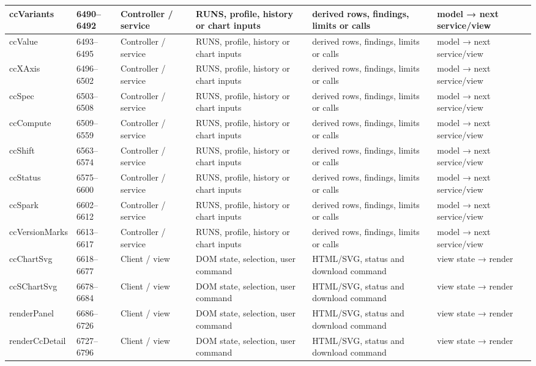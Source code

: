 \begin{landscape}
\begin{longtable}{@{}p{3.2cm}p{1.45cm}p{2.7cm}p{4.0cm}p{4.0cm}p{3.0cm}@{}}
ccVariants & 6490--6492 & Controller / service & RUNS, profile, history or chart inputs & derived rows, findings, limits or calls & model → next service/view \\\hline
ccValue & 6493--6495 & Controller / service & RUNS, profile, history or chart inputs & derived rows, findings, limits or calls & model → next service/view \\\hline
ccXAxis & 6496--6502 & Controller / service & RUNS, profile, history or chart inputs & derived rows, findings, limits or calls & model → next service/view \\\hline
ccSpec & 6503--6508 & Controller / service & RUNS, profile, history or chart inputs & derived rows, findings, limits or calls & model → next service/view \\\hline
ccCompute & 6509--6559 & Controller / service & RUNS, profile, history or chart inputs & derived rows, findings, limits or calls & model → next service/view \\\hline
ccShift & 6563--6574 & Controller / service & RUNS, profile, history or chart inputs & derived rows, findings, limits or calls & model → next service/view \\\hline
ccStatus & 6575--6600 & Controller / service & RUNS, profile, history or chart inputs & derived rows, findings, limits or calls & model → next service/view \\\hline
ccSpark & 6602--6612 & Controller / service & RUNS, profile, history or chart inputs & derived rows, findings, limits or calls & model → next service/view \\\hline
ccVersionMarks & 6613--6617 & Controller / service & RUNS, profile, history or chart inputs & derived rows, findings, limits or calls & model → next service/view \\\hline
ccChartSvg & 6618--6677 & Client / view & DOM state, selection, user command & HTML/SVG, status and download command & view state → render \\\hline
ccSChartSvg & 6678--6684 & Client / view & DOM state, selection, user command & HTML/SVG, status and download command & view state → render \\\hline
renderPanel & 6686--6726 & Client / view & DOM state, selection, user command & HTML/SVG, status and download command & view state → render \\\hline
renderCcDetail & 6727--6796 & Client / view & DOM state, selection, user command & HTML/SVG, status and download command & view state → render \\\hline

\end{longtable}
\end{landscape}
